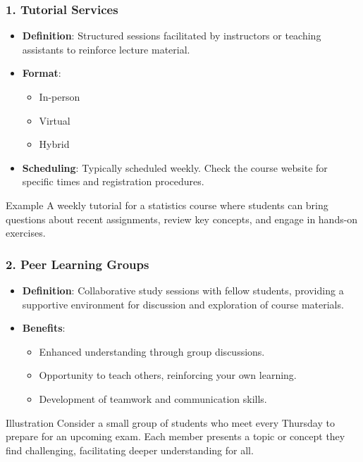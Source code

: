 \documentclass[aspectratio=169]{beamer}
\begin{document}
\begin{frame}[fragile]
    \frametitle{1. Tutorial Services}
    \begin{itemize}
        \item \textbf{Definition}: Structured sessions facilitated by instructors or teaching assistants to reinforce lecture material.
        \item \textbf{Format}: 
            \begin{itemize}
                \item In-person
                \item Virtual
                \item Hybrid
            \end{itemize}
        \item \textbf{Scheduling}: Typically scheduled weekly. Check the course website for specific times and registration procedures.
    \end{itemize}
    \begin{block}{Example}
        A weekly tutorial for a statistics course where students can bring questions about recent assignments, review key concepts, and engage in hands-on exercises.
    \end{block}
\end{frame}

\begin{frame}[fragile]
    \frametitle{2. Peer Learning Groups}
    \begin{itemize}
        \item \textbf{Definition}: Collaborative study sessions with fellow students, providing a supportive environment for discussion and exploration of course materials.
        \item \textbf{Benefits}:
            \begin{itemize}
                \item Enhanced understanding through group discussions.
                \item Opportunity to teach others, reinforcing your own learning.
                \item Development of teamwork and communication skills.
            \end{itemize}
    \end{itemize}
    \begin{block}{Illustration}
        Consider a small group of students who meet every Thursday to prepare for an upcoming exam. Each member presents a topic or concept they find challenging, facilitating deeper understanding for all.
    \end{block}
\end{frame}
\end{document}
